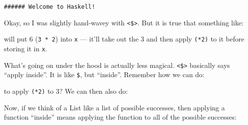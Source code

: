 \documentclass[]{article}
\newenvironment{Shaded}{}{}
\newcommand{\DataTypeTok}[1]{\textcolor[rgb]{0.56,0.13,0.00}{{#1}}}
\newcommand{\DecValTok}[1]{\textcolor[rgb]{0.25,0.63,0.44}{{#1}}}
\newcommand{\OtherTok}[1]{\textcolor[rgb]{0.00,0.44,0.13}{{#1}}}
\newcommand{\FunctionTok}[1]{\textcolor[rgb]{0.02,0.16,0.49}{{#1}}}
\newcommand{\NormalTok}[1]{{#1}}
\begin{document}
\begin{verbatim}
###### Welcome to Haskell!
\end{verbatim}

Okay, so I was slightly hand-wavey with \texttt{\textless{}\$\textgreater{}}.
But it is true that something like:

\begin{Shaded}
\end{Shaded}

will put 6 (\texttt{3\ *\ 2}) into \texttt{x} --- it'll take out the 3 and then
apply \texttt{(*2)} to it before storing it in \texttt{x}.

What's going on under the hood is actually less magical.
\texttt{\textless{}\$\textgreater{}} basically says ``apply inside''. It is like
\texttt{\$}, but ``inside''. Remember how we can do:

\begin{Shaded}
\end{Shaded}

to apply \texttt{(*2)} to 3? We can then also do:

\begin{Shaded}
\end{Shaded}

Now, if we think of a List like a list of possible successes, then applying a
function ``inside'' means applying the function to all of the possible
successes:
\end{document}
